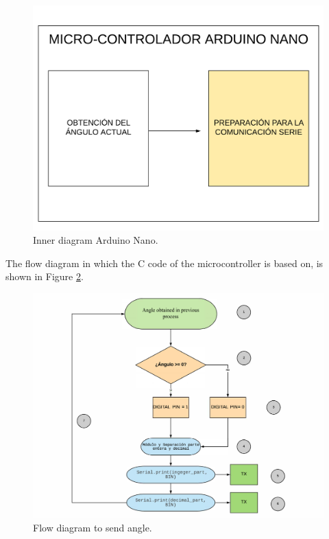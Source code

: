 \begin{figure}[H]
	\center
	\includegraphics[trim = 0mm 0mm 0mm 0mm, clip,scale=0.3]{imagenes/Balancing_robot/coexistencia3.pdf}
	\caption{Inner diagram Arduino Nano.}
	\label{fig:coexistencia3}
\end{figure}

The flow diagram in which the C code of the microcontroller is based on, is shown in Figure \ref{fig:extraccion_angulo}.

\begin{figure}[H]
	\center
	\includegraphics[trim = 0mm 0mm 0mm 0mm, clip,scale=0.5]{imagenes/Balancing_robot/extraccion_angulo.pdf}
	\caption{Flow diagram to send angle.}
	\label{fig:extraccion_angulo}
\end{figure}


